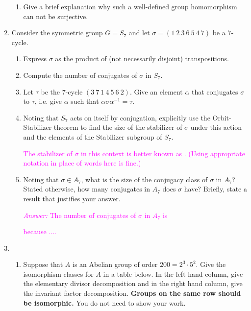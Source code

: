 \documentclass{report}
\newcommand{\tcm}{\textcolor{magenta}}
\begin{document}
\begin{enumerate}
\begin{enumerate}
\item Give a brief explanation why such a well-defined group homomorphism can not be surjective.

\end{enumerate}

\item Consider the symmetric group $G = S_{7}$ and let $\sigma = (1 \ 2 \ 3 \ 6 \ 5 \ 4 \  7 )$ be a $7$-cycle.  

\begin{enumerate}

\item Express $\sigma$ as the product of (not necessarily disjoint) transpositions.

\item Compute the number of conjugates of $\sigma$ in $S_7$.

\item Let $\tau$ be the $7$-cycle $(3 \ 7 \ 1 \ 4 \ 5 \ 6 \ 2)$.  Give an element $\alpha$ that conjugates
$\sigma$ to $\tau$, i.e.  give $\alpha$ such that $\alpha \sigma {\alpha}^{-1} = \tau$.

\item Noting that $S_7$ acts on itself by conjugation, explicitly use the Orbit-Stabilizer theorem to find the 
size of the stabilizer of $\sigma$ under this action and the elements of the Stabilizer subgroup
of $S_7$.  

\tcm{The stabilizer of $\sigma$ in this context  is better known as  \underline{\hskip 3cm}. (Using appropriate notation in place of words 
here is fine.)}

\item Noting that $\sigma \in A_7$, what is the size of the conjugacy class of $\sigma$ in $A_7$?
Stated otherwise, how many conjugates in $A_7$ does $\sigma$ have?  Briefly, state a result that justifies
your answer.

\tcm{\emph{Answer:} The number of conjugates of $\sigma$ in $A_7$ is \underline{\hskip 2cm}} 

\medskip

\tcm{because ....}

\end{enumerate}

\item 

\begin{enumerate}

\item Suppose that $A$ is an Abelian group of order $200 =  2^3 \cdot 5^2$.  Give the isomorphism
classes for $A$ in a table below.  In the left hand column, give the elementary divisor decomposition
and in the right hand column, give the invariant factor decomposition.  {\bf Groups on the same row should
be isomorphic.}  You do not need to show your work.


\end{enumerate}
\end{enumerate}
\end{document}
